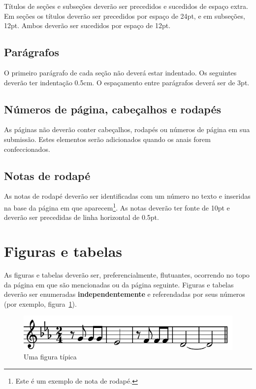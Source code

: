 \documentclass[12pt]{article}
\begin{document}
Títulos de seções e subseções deverão ser precedidos e sucedidos de
espaço extra. Em seções os títulos deverão ser precedidos por espaço
de 24pt, e em subseções, 12pt. Ambos deverão ser sucedidos por espaço
de 12pt.

\subsection{Parágrafos}
\label{sec:paragrafos}

O primeiro parágrafo de cada seção não deverá estar indentado. Os
seguintes deverão ter indentação 0.5cm. O espaçamento entre parágrafos
deverá ser de 3pt.

\subsection{Números de página, cabeçalhos e rodapés}

As páginas não deverão conter cabeçalhos, rodapés ou números de página
em sua submissão. Estes elementos serão adicionados quando os anais
forem confeccionados.

\subsection{Notas de rodapé}

As notas de rodapé deverão ser identificadas com um número no texto e
inseridas na base da página em que aparecem\footnote{Este é um exemplo
  de nota de rodapé.}. As notas deverão ter fonte de 10pt e deverão ser
precedidas de linha horizontal de 0.5pt.

\section{Figuras e tabelas}
\label{sec:figuras-e-tabelas}

As figuras e tabelas deverão ser, preferencialmente, flutuantes,
ocorrendo no topo da página em que são mencionadas ou da página
seguinte. Figuras e tabelas deverão ser enumeradas
\textbf{independentemente} e referendadas por seus números (por
exemplo, figura~\ref{fig:exampleFig}).

\begin{figure}
\centering
\includegraphics[width=.5\textwidth]{beethoven}
\caption{Uma figura típica}
\label{fig:exampleFig}
\end{figure}
\end{document}
